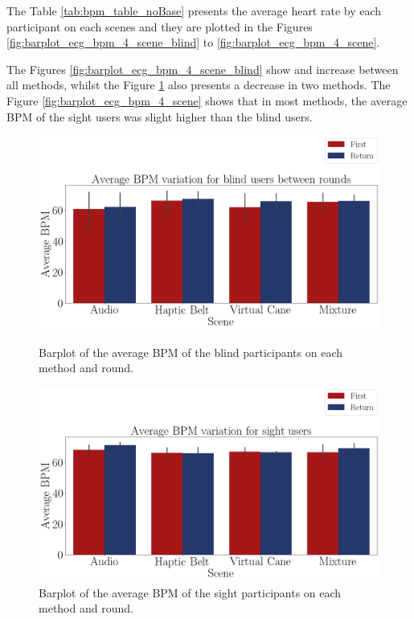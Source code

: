 The Table \ref{tab:bpm_table_noBase} presents the average heart rate by each participant on each scenes and they are plotted in the Figures \ref{fig:barplot_ecg_bpm_4_scene_blind} to \ref{fig:barplot_ecg_bpm_4_scene}.



The Figures \ref{fig:barplot_ecg_bpm_4_scene_blind} show and increase between all methods, whilst the Figure \ref{fig:barplot_ecg_bpm_4_scene_sight} also presents a decrease in two methods. The Figure \ref{fig:barplot_ecg_bpm_4_scene} shows that in most methods, the average BPM of the sight users was slight higher than the blind users.

\begin{figure}[!htb]
    \centering
    \begin{minipage}{\textwidth}
        \centering
        \includegraphics[width = 0.8\linewidth]{Resultados/ECG/Figuras/png/barplot_ecg_bpm_4_scene_blind.png}
        \caption{Barplot of the average BPM of the blind participants on each method and round.}
        \label{fig:barplot_ecg_bpm_4_scene_blind}
    \end{minipage}
    \begin{minipage}{\textwidth}
        \centering
        \includegraphics[width = 0.8\linewidth]{Resultados/ECG/Figuras/png/barplot_ecg_bpm_4_scene_sight.png}
        \caption{Barplot of the average BPM of the sight participants on each method and round.}
        \label{fig:barplot_ecg_bpm_4_scene_sight}
    \end{minipage}
\end{figure}
